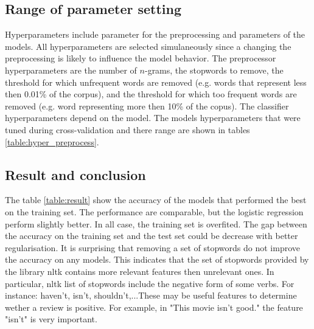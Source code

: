 \documentclass[10pt]{article}
\begin{document}
\subsection*{Range of parameter setting}

Hyperparameters include parameter for the preprocessing and parameters of the models. All hyperparameters are selected simulaneously since a changing the preprocessing is likely to influence the model behavior. The preprocessor hyperparameters are the number of $n$-grams, the stopwords to remove, the threshold for which unfrequent words are removed (e.g. words that represent less then 0.01\% of the corpus), and the threshold for which too frequent words are removed (e.g. word representing more then 10\% of the copus). The classifier hyperparameters depend on the model. The models hyperparameters that were tuned during cross-validation and there range are shown in tables \ref{table:hyper_preprocess}.

\begin{table}[h!]
    \caption{Range of hyperparameters}
    \label{table:hyper_preprocess}
\end{table}


\subsection*{Result and conclusion}
The table \ref{table:result} show the accuracy of the models that performed the best on the training set. The performance are comparable, but the logistic regression perform slightly better. In all case, the training set is overfited. The gap between the accuracy on the training set and the test set could be decrease with better regularisation. It is surprising that removing a set of stopwords do not improve the accuracy on any models. This indicates that the set of stopwords provided by the library nltk contains more relevant features then unrelevant ones. In particular, nltk list of stopwords include the negative form of some verbs. For instance: haven't, isn't, shouldn't,...These may be useful features to determine wether a review is positive. For example, in "This movie isn't good." the feature "isn't" is very important.
\end{document}
